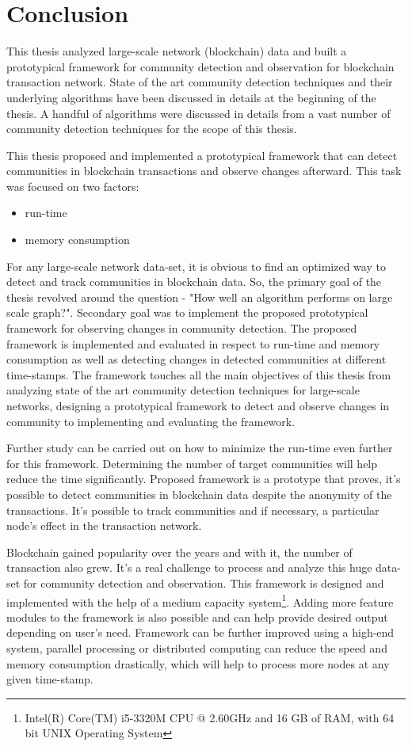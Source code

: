 \chapter{Conclusion}
\label{cha:conclusion}

This thesis analyzed large-scale network (blockchain) data and built a prototypical framework for community detection and observation for blockchain transaction network. State of the art community detection techniques and their underlying algorithms have been discussed in details at the beginning of the thesis. A handful of algorithms were discussed in details from a vast number of community detection techniques for the scope of this thesis.

This thesis proposed and implemented a prototypical framework that can detect communities in blockchain transactions and observe changes afterward. This task was focused on two factors: 
\begin{itemize}
	\item run-time
	\item memory consumption
\end{itemize}
\noindent For any large-scale network data-set, it is obvious to find an optimized way to detect and track communities in blockchain data. So, the primary goal of the thesis revolved around the question - "How well an algorithm performs on large scale graph?". Secondary goal was to implement the proposed prototypical framework for observing changes in community detection. The proposed framework is implemented and evaluated in respect to run-time and memory consumption as well as detecting changes in detected communities at different time-stamps. The framework touches all the main objectives of this thesis from analyzing state of the art community detection techniques for large-scale networks, designing a prototypical framework to detect and observe changes in community to implementing and evaluating the framework.

Further study can be carried out on how to minimize the run-time even further for this framework. Determining the number of target communities will help reduce the time significantly. Proposed framework is a prototype that proves, it's possible to detect communities in blockchain data despite the anonymity of the transactions. It's possible to track communities and if necessary, a particular node's effect in the transaction network.

Blockchain gained popularity over the years and with it, the number of transaction also grew. It's a real challenge to process and analyze this huge data-set for community detection and observation. This framework is designed and implemented with the help of a medium capacity system\footnote{Intel(R) Core(TM) i5-3320M CPU @ 2.60GHz and 16 GB of RAM, with 64 bit UNIX Operating System}. Adding more feature modules to the framework is also possible and can help provide desired output depending on user's need. Framework can be further improved using a high-end system, parallel processing or distributed computing can reduce the speed and memory consumption drastically, which will help to process more nodes at any given time-stamp.

